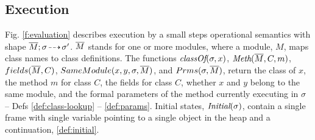   

  
\subsection{\LangOO Execution}
\label{sect:execution}

{Fig. \ref{f:evaluation} describes \LangOO execution}  by a small steps operational semantics with shape  $\overline{M};\sigma\! \dashrightarrow\! {\sigma'}$.
  $\overline{M}$ stands for one or more modules, where a
  module,  $M$, maps class names to class definitions. 
  {%
  The functions $\textit{classOf}(\sigma, x)$, $\textit{Meth}(\overline{M}, C, m)$,
  { $fields(\overline{M},C)$,}
    ${SameModule(x,y,\sigma,\overline{M})}$, and $Prms(\sigma,\overline{M})$,
return the class of $x$, the method $m$ for class $C$, {the fields for class $C$,} whether $x$ and $y$ belong to the same module, and 
 the formal parameters of the method currently executing in $\sigma$ -- \cf Defs
\ref{def:class-lookup} -- \ref{def:params}. %
Initial states, $\textit{Initial}(\sigma)$, contain a single frame 
with single variable  pointing to a single object 
in the heap %
and a continuation, \cf \ref{def:initial}.
}

